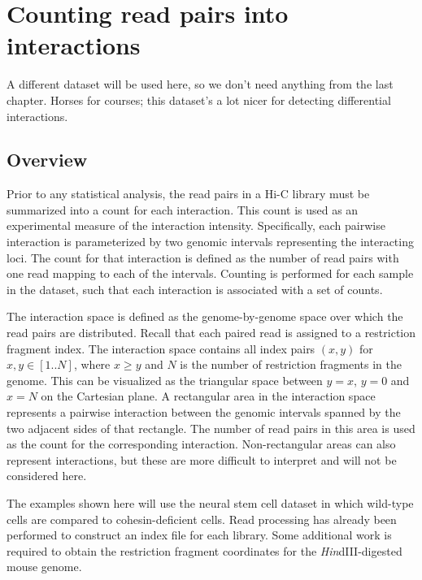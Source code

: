 \documentclass{report}\usepackage[]{graphicx}\usepackage[usenames,dvipsnames]{color}
\newenvironment{combox}
{ \definecolor{shadecolor}{RGB}{255, 240, 240} \begin{shaded}\begin{center}\begin{minipage}[t]{0.95\textwidth} }
{ \end{minipage}\end{center}\end{shaded} \definecolor{shadecolor}{RGB}{240,240,240} }
\begin{document}
\chapter{Counting read pairs into interactions}
\label{chap:counting}

\begin{combox}
A different dataset will be used here, so we don't need anything from the last chapter.
Horses for courses; this dataset's a lot nicer for detecting differential interactions.
\end{combox}

\section{Overview}
Prior to any statistical analysis, the read pairs in a Hi-C library must be summarized into a count for each interaction.
This count is used as an experimental measure of the interaction intensity.
Specifically, each pairwise interaction is parameterized by two genomic intervals representing the interacting loci.
The count for that interaction is defined as the number of read pairs with one read mapping to each of the intervals.
Counting is performed for each sample in the dataset, such that each interaction is associated with a set of counts.

The interaction space is defined as the genome-by-genome space over which the read pairs are distributed.
Recall that each paired read is assigned to a restriction fragment index.
The interaction space contains all index pairs $(x, y)$ for $x, y \in [1 .. N]$, where $x \ge y$ and $N$ is the number of restriction fragments in the genome.
This can be visualized as the triangular space between $y=x$, $y=0$ and $x=N$ on the Cartesian plane.
A rectangular area in the interaction space represents a pairwise interaction between the genomic intervals spanned by the two adjacent sides of that rectangle.
The number of read pairs in this area is used as the count for the corresponding interaction.
Non-rectangular areas can also represent interactions, but these are more difficult to interpret and will not be considered here.

The examples shown here will use the neural stem cell dataset \cite{sofueva2013cohesin} in which wild-type cells are compared to cohesin-deficient cells.
Read processing has already been performed to construct an index file for each library.
Some additional work is required to obtain the restriction fragment coordinates for the \textit{Hin}dIII-digested mouse genome.
\end{document}

